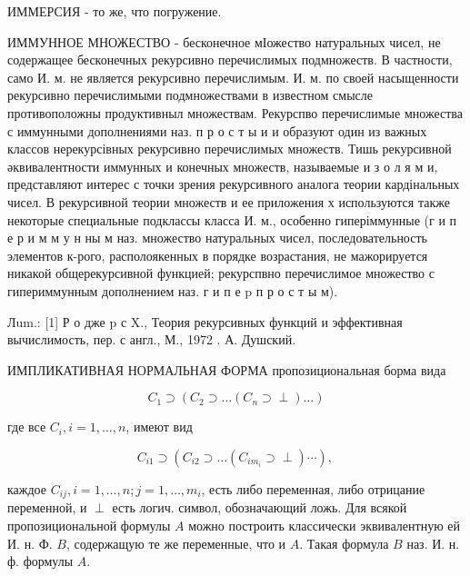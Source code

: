\documentclass[10pt]{article}
\begin{document}
ИММЕРСИЯ - то же, что погружение.



ИММУННОЕ МНОЖЕСТВО - бесконечное мІожество натуральных чисел, не содержащее бесконечных рекурсивно перечислимых подмножеств. В частности, само И. м. не является рекурсивно перечислимым. И. м. по своей насыщенности рекурсивно перечислимыми подмножествами в известном смысле противоположны продуктивныл множествам. Рекурспво перечислимые множества с иммунными дополнениями наз. п р о с т ы и и образуют один из важных классов нерекурсівных рекурсивно перечислимых множеств. Тишь рекурсивной әквивалентности иммунных и конечных множеств, называемые и з о л я м и, представляют интерес с точки зрения рекурсивного аналога теории кардінальных чисел. В рекурсивной теории множеств и ее приложения х используются также некоторые специальные подклассы класса И. м., особенно гиперіммунные (г и п е р и м м у н ны м наз. множество натуральных чисел, последовательность элементов к-рого, располоякенных в порядке возрастания, не мажорируется никакой общерекурсивной функцией; рекурспвно перечислимое множество с гипериммунным дополнением наз. г и п е $\mathrm{p}$ п р о с т ы м).



Лum.: [1] Р о дже $\mathrm{p}$ с X., Теория рекурсивных функций и эффективная вычислимость, пер. с англ., М., 1972 . А. Душский.



ИМПЛИКАТИВНАЯ НОРМАЛЬНАЯ ФОРМА пропозициональная борма вида



\[

C_{1} \supset\left(C_{2} \supset \ldots\left(C_{n} \supset \perp\right) \ldots\right)

\]



где все $C_{i}, i=1, \ldots, n$, имеют вид



\[

C_{i 1} \supset\left(C_{i 2} \supset \ldots\left(C_{i m_{i}} \supset \perp\right) \cdots\right) \text {, }

\]



каждое $C_{i j}, i=1, \ldots, n ; j=1, \ldots, m_{i}$, есть либо переменная, либо отрицание переменной, и $\perp$ есть логич. символ, обозначающий ложь. Для всякой пропозициональной формулы $A$ можно построить классически эквивалентную ей И. н. Ф. $B$, содержащую те же переменные, что и $A$. Такая формула $B$ наз. И. н. ф. формулы $A$.
\end{document}
